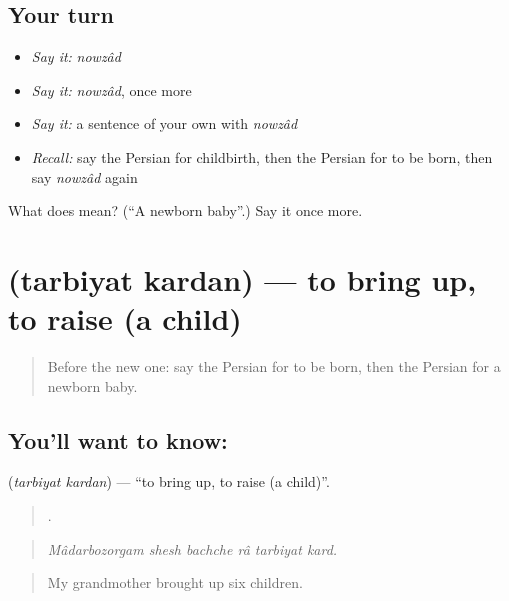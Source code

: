 \subsection*{Your turn}
\begin{itemize}
\raggedright
  \item \emph{Say it:} \emph{nowzâd}
  \item \emph{Say it:} \emph{nowzâd}, once more
  \item \emph{Say it:} a sentence of your own with \emph{nowzâd}
  \item \emph{Recall:} say the Persian for childbirth, then the Persian for to be born, then say \emph{nowzâd} again
\end{itemize}

\begin{tcolorbox}[breakable,colback=teal!4,colframe=teal!35!black,title={Before you move on}]
What does  mean? (\textquotedblleft{}A newborn baby\textquotedblright{}.) Say it once more.
\end{tcolorbox}
\section[\texorpdfstring{\fa{تربیت} \fa{کردن} (tarbiyat kardan)}{تربیت کردن (tarbiyat kardan)}]{  (tarbiyat kardan) — to bring up, to raise (a child)}

\label{lesson:FA-C332-tarbiyat-kardan}



\begin{quote}
Before the new one: say the Persian for to be born, then the Persian for a newborn baby.
\end{quote}

\subsection*{You'll want to know:  }
\textbf{ } (\emph{tarbiyat kardan}) — \textquotedblleft{}to bring up, to raise (a child)\textquotedblright{}.

\begin{quote}
     .
\end{quote}

\begin{quote}
\emph{Mâdarbozorgam shesh bachche râ tarbiyat kard.}
\end{quote}

\begin{quote}
My grandmother brought up six children.
\end{quote}

